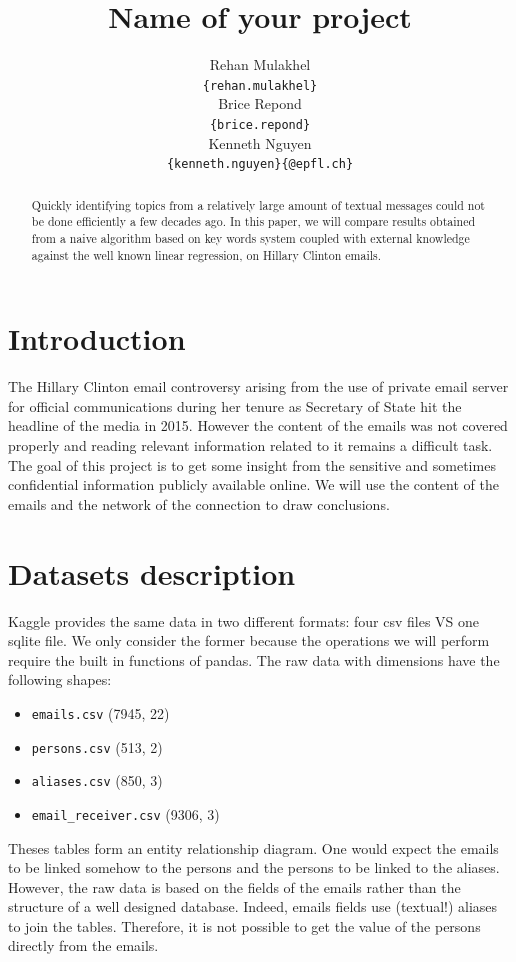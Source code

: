 \documentclass[11pt]{article}
\title{Name of your project}
\author{Rehan Mulakhel \\
  {\tt \{rehan.mulakhel\}} \\\And
  Brice Repond \\
  {\tt \{brice.repond\}} \\\And
  Kenneth Nguyen \\
{\tt \{kenneth.nguyen\}\{@epfl.ch\}} \\}
\date{}
\begin{document}
\maketitle
\begin{abstract}
Quickly identifying topics from a relatively large amount of textual messages could not be done efficiently a few decades ago. In this paper, we will compare results obtained from a naive algorithm based on key words system coupled with external knowledge against the well known linear regression, on Hillary Clinton emails.
\end{abstract}

\section{Introduction}

The Hillary Clinton email controversy arising from the use of private email server for official communications during her tenure as Secretary of State hit the headline of the media in 2015. However the content of the emails was not covered properly and reading relevant information related to it remains a difficult task. The goal of this project is to get some insight from the sensitive and sometimes confidential information publicly available online. We will use the content of the emails and the network of the connection to draw conclusions.

\section{Datasets description}

Kaggle provides the same data in two different formats: four csv files VS one sqlite file. We only consider the former because the operations we will perform require the built in functions of pandas. The raw data with dimensions have the following shapes:

\begin{itemize}
    \item \texttt{emails.csv} (7945, 22)
    \item \texttt{persons.csv} (513, 2)
    \item \texttt{aliases.csv} (850, 3)
    \item \texttt{email\_receiver.csv} (9306, 3)
\end{itemize}

Theses tables form an entity relationship diagram. One would expect the emails to be linked somehow to the persons and the persons to be linked to the aliases. However, the raw data is based on the fields of the emails rather than the structure of a well designed database. Indeed, emails fields use (textual!) aliases to join the tables. Therefore, it is not possible to get the value of the persons directly from the emails.
\end{document}
